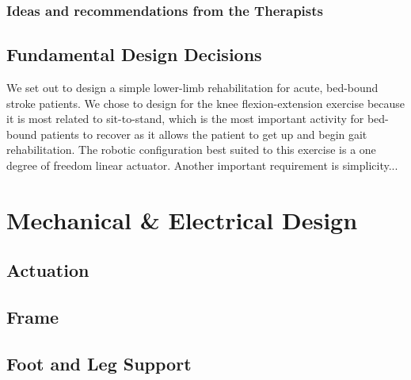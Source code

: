 \documentclass[12pt]{report}
\begin{document}
	 \subsubsection{Ideas and recommendations from the Therapists}
	
	\subsection{Fundamental Design Decisions}
%
We set out to design a simple lower-limb rehabilitation for acute, bed-bound stroke patients. We chose to design for the knee flexion-extension exercise because it is most related to sit-to-stand, which is the most important activity for bed-bound patients to recover as it allows the patient to get up and begin gait rehabilitation. The robotic configuration best suited to this exercise is a one degree of freedom linear actuator. 
	Another important requirement is simplicity...

\section{Mechanical \& Electrical Design}
	\subsection{Actuation}
%

	\subsection{Frame}
%
	\subsection{Foot and Leg Support}
%
\end{document}
